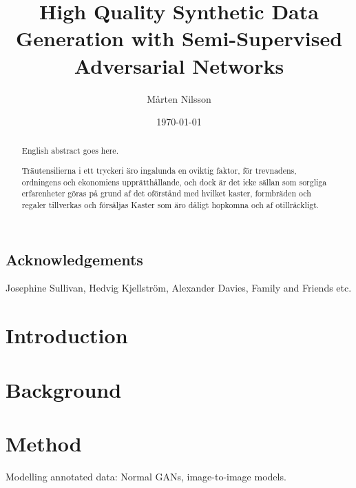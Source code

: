 \documentclass{kththesis}
\title{High Quality Synthetic Data Generation with Semi-Supervised Adversarial Networks}
\author{Mårten Nilsson}
\date{\today}
\begin{document}
\frontmatter

\titlepage

\begin{abstract}
  English abstract goes here.

  \blindtext
\end{abstract}


\begin{otherlanguage}{swedish}
  \begin{abstract}
    Träutensilierna i ett tryckeri äro ingalunda en oviktig faktor,
    för trevnadens, ordningens och ekonomiens upprätthållande, och
    dock är det icke sällan som sorgliga erfarenheter göras på grund
    af det oförstånd med hvilket kaster, formbräden och regaler
    tillverkas och försäljas Kaster som äro dåligt hopkomna och af
    otillräckligt.
  \end{abstract}
\end{otherlanguage}

\section*{Acknowledgements}
Josephine Sullivan, Hedvig Kjellström, Alexander Davies, Family and Friends etc. 

\tableofcontents


\mainmatter


\chapter{Introduction}




\chapter{Background}


\chapter{Method}
Modelling annotated data: Normal GANs, image-to-image models.
\end{document}
